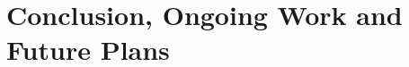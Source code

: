 \documentclass{beamer}
\begin{document}

\section{Conclusion, Ongoing Work and Future Plans}
\end{document}
